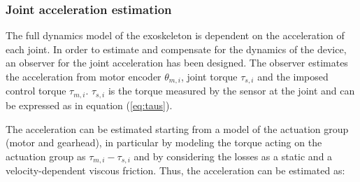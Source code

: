 %





\subsubsection{Joint acceleration estimation}  \label{acc_observer}

The full dynamics model of the exoskeleton  is dependent on the acceleration of each joint. In order to estimate and compensate for the dynamics of the device, an observer for the joint acceleration has been designed. 
The observer estimates the acceleration from motor encoder $\theta_{m,i}$,  joint torque $\tau_{s,i}$ and the imposed control torque $\tau_{m,i}$.
$\tau_{s,i}$ is the torque measured by the sensor at the joint and can be expressed as in equation (\ref{eq:taus}).

The acceleration can be estimated starting from a model of the actuation group (motor and gearhead), in particular by modeling the torque acting on the actuation group as $\tau_{m,i}-\tau_{s,i}$ and by considering the losses as a static and a velocity-dependent viscous friction. Thus, the acceleration can be estimated as:




